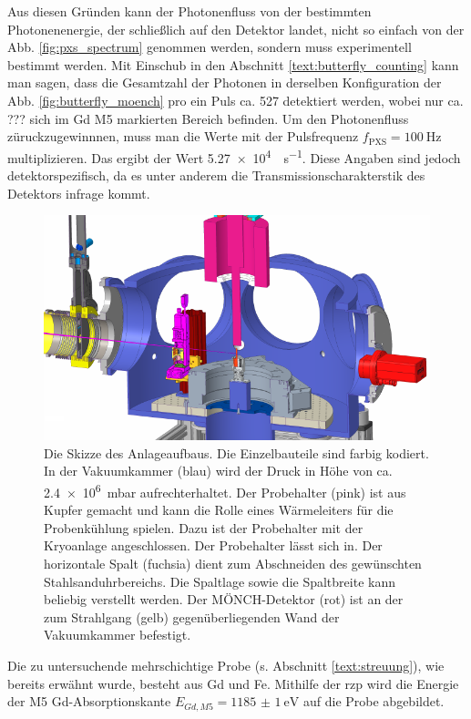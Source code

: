\noindent
Aus diesen Gründen kann der Photonenfluss von der bestimmten Photonenenergie, der schließlich auf den Detektor landet, nicht so einfach von der Abb. \ref{fig:pxs_spectrum} genommen werden, sondern muss experimentell bestimmt werden. Mit Einschub in den Abschnitt \ref{text:butterfly_counting} kann man sagen, dass die Gesamtzahl der Photonen in derselben Konfiguration der Abb. \ref{fig:butterfly_moench} pro ein Puls ca. 527 detektiert werden, wobei nur ca. ??? sich im Gd M5 markierten Bereich befinden. Um den Photonenfluss züruckzugewinnnen, muss man die Werte mit der Pulsfrequenz $f_\text{PXS} = \SI{100}{\hertz}$ multiplizieren. Das ergibt der Wert \SI{5.27e4}{\photons\per\second}.  Diese Angaben sind jedoch detektorspezifisch, da es unter anderem die Transmissionscharakterstik des Detektors infrage kommt.
\begin{figure}[H]
    \centering
    \includegraphics{images/aufbau/aufbau_empty.pdf}
    \caption{Die Skizze des Anlageaufbaus. Die Einzelbauteile sind farbig kodiert. In der Vakuumkammer (blau) wird der Druck in Höhe von ca. \SI{2.4e6}{\milli\bar} aufrechterhaltet. Der Probehalter (pink) ist aus Kupfer gemacht und kann die Rolle eines Wärmeleiters für die Probenkühlung spielen. Dazu ist der Probehalter mit der Kryoanlage angeschlossen. Der Probehalter lässt sich in. Der horizontale Spalt (fuchsia) dient zum Abschneiden des gewünschten Stahlsanduhrbereichs. Die Spaltlage sowie die Spaltbreite kann beliebig verstellt werden. Der MÖNCH-Detektor (rot) ist an der zum Strahlgang (gelb) gegenüberliegenden Wand der Vakuumkammer befestigt.}
    \label{fig:anlage}
\end{figure}

\noindent
Die zu untersuchende mehrschichtige Probe (s. Abschnitt \ref{text:streuung}), wie bereits erwähnt wurde, besteht aus Gd und Fe. Mithilfe der \gls{rzp} wird die Energie der M5 Gd-Absorptionskante $E_{Gd, M5} = \SI{1185(1)}{\eV}$ \cite[Abb. 6(a)]{prieto_x-ray_2005} auf die Probe abgebildet.